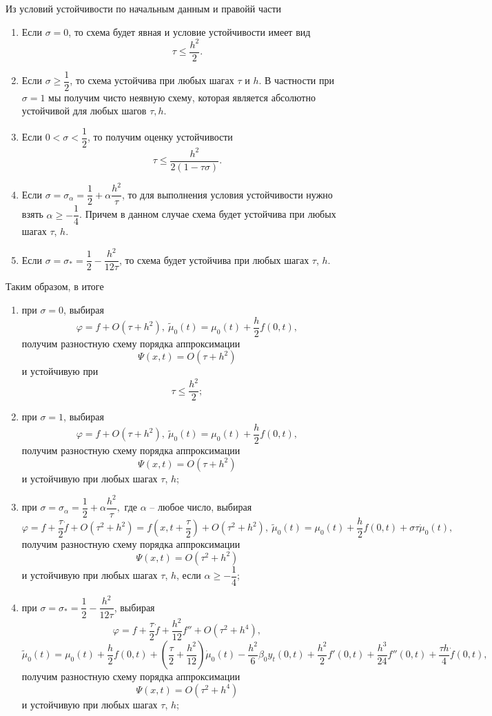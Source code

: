 \documentclass[a4paper, 12pt]{article}
\begin{document}
    	Из условий устойчивости по начальным данным и правойй части
    	\begin{enumerate}
    		\item Если $\sigma = 0$, то схема будет явная и условие устойчивости имеет вид
    		\begin{equation*}
    			\tau \leq \dfrac{h^2}{2}.
    		\end{equation*}
    		\item Если $\sigma \geq \dfrac 12$, то схема устойчива при любых шагах $\tau$ и $h$. В частности при $\sigma = 1$ мы получим чисто неявную схему, которая является абсолютно устойчивой для любых шагов $\tau, h$.
    		\item Если $ 0 < \sigma < \dfrac 12$, то получим оценку устойчивости
    		\begin{equation*}
    			\tau \leq \dfrac{h^2}{2(1-\tau\sigma)}.
    		\end{equation*}
    		\item Если $\sigma = \sigma_\alpha = \dfrac 12 + \alpha \dfrac {h^2}{\tau}$, то для выполнения условия устойчивости нужно взять $\alpha \geq -\dfrac 1 4$. Причем в данном случае схема будет устойчива при любых шагах $\tau$, $h$.
    		\item Если $\sigma = \sigma_* = \dfrac 12 - \dfrac{h^2}{12\tau}$, то схема будет устойчива при любых шагах $\tau$, $h$.
    	\end{enumerate}
    	Таким образом, в итоге 
    	\begin{enumerate}
    		\item при $\sigma = 0$,
    		выбирая
    		$$\varphi = f + O(\tau + h^2),\ \tilde \mu_0(t) = \mu_0(t) + \dfrac h2 f(0,t),$$
    		получим разностную схему порядка аппроксимации
    		$$\Psi (x,t) = O(\tau + h^2)$$
    		и устойчивую при $$\tau \leq \dfrac{h^2}{2};$$
    		\item при $\sigma = 1$, выбирая 
    		$$\varphi = f + O(\tau + h^2),\ \tilde \mu_0(t) = \mu_0(t) + \dfrac h2 f(0,t),$$
    		получим разностную схему порядка аппроксимации
    		$$\Psi (x,t) = O(\tau + h^2)$$
    		и устойчивую при любых шагах $\tau$, $h$;
    		\item при $\sigma = \sigma_\alpha = \dfrac 12 + \alpha \dfrac{h^2}{\tau},$ где $\alpha$ -- любое число, выбирая
    		$$\varphi = f + \dfrac \tau 2 \dot f + O(\tau^2 + h^2) = f\left(x,t + \dfrac \tau 2\right) + O(\tau^2 + h^2),\ \tilde \mu_0(t) = \mu_0(t) + \dfrac h2 f(0,t) + \sigma \tau \dot \mu_0(t),$$ получим разностную схему порядка аппроксимации
    		$$\Psi (x,t) = O(\tau^2 + h^2)$$
    		и устойчивую при любых шагах $\tau$, $h$, если $\alpha\geq - \dfrac 14$;
    		\item при $\sigma = \sigma_* = \dfrac 12 - \dfrac {h^2}{12\tau}$, выбирая
    		$$\varphi = f + \dfrac \tau 2 \dot f + \dfrac{h^2}{12}f'' + O(\tau^2 + h^4), $$
    		$$\tilde \mu_0(t) = \mu_0(t) + \dfrac h2 f(0,t) + \left(\dfrac \tau 2 + \dfrac {h^2}{12}\right)\dot \mu_0(t) - \dfrac{h^2}{6}\beta_0 y_t(0,t) + \dfrac {h^2}{2}f'(0,t) + \dfrac{h^3}{24}f''(0,t) + \dfrac{\tau h}{4}\dot f(0,t),$$
    		получим разностную схему порядка аппроксимации
    		$$\Psi (x,t) = O(\tau^2 + h^4)$$
    		и устойчивую при любых шагах $\tau$, $h$;
    	\end{enumerate}
\end{document}
